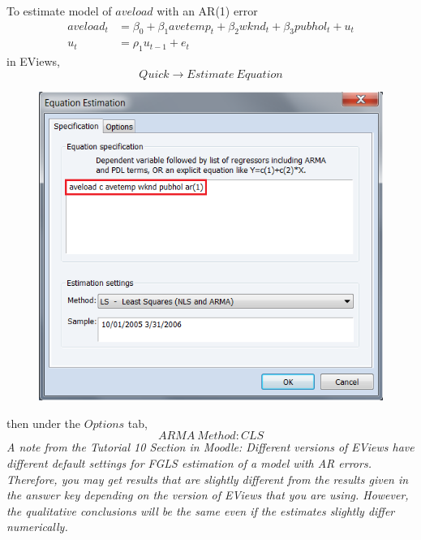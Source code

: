 \documentclass[12pt]{report}
\begin{document}
\newpage
\noindent To estimate model of $aveload$ with an AR(1) error \begin{align*}
aveload_t &= \beta_0 + \beta_1 avetemp_t + \beta_2wknd_t + \beta_3pubhol_t + u_t \\
u_t &= \rho_1u_{t-1} + e_t
\end{align*} in EViews, $$Quick \to Estimate\ Equation$$
\begin{figure}[H]
	\centerline{\includegraphics{tute10_11}}
\end{figure}
\vspace{-\baselineskip} then under the $Options$ tab, $$ARMA\ Method:CLS$$ \noindent \textit{A note from the Tutorial 10 Section in Moodle: Different versions of EViews have different default settings for FGLS estimation of a model with AR errors. Therefore, you may get results that are slightly different from the results given in the answer key depending on the version of EViews that you are using. However, the qualitative conclusions will be the same even if the estimates slightly differ numerically.}
\end{document}
